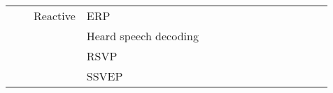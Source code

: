\begin{tabular}{p{1.5cm}p{1.5cm}p{1.5cm}p{1.5cm}p{0.6cm}p{0.6cm}p{0.6cm}p{0.6cm}p{0.6cm}p{0.6cm}p{0.6cm}p{0.6cm}p{0.6cm}p{0.6cm}p{0.6cm}}
                                &                 & Reactive & ERP &                                                             &                                                                       \cite{Yoon2018, Volker2018, Behncke2017, Cecotti2011} &                                                                        &                  &                                      &                                                            &                      &                       &                                 &                         &                                                                      \\
                                &                 &                   & Heard speech decoding &                                                             &                                                                                                                             &                                                                        &                  &                                      &                                                            &                      &                       &                                 &                         &                                                \cite{Moinnereau2018} \\
                                &                 &                   & RSVP &                                                             &                                         \cite{Parekh2018, Zafar2017, Hajinoroozi2017, Shamwell2016, Manor2015, Cecotti2014} &                                                  \cite{Spampinato2017} &                  &                                      &                                                            &                      &                       &                                 &                         &                                                                      \\
                                &                 &                   & SSVEP &                                    \cite{Perez-Benitez2018} &                                                                                   \cite{Aznan2018, Waytowich2018, kwak2017} &                                                                        &                  &                                      &                                                            &                      &                       &                                 &                         &                                                                      \\

\end{tabular}
